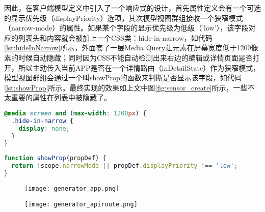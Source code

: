 因此，在客户端模型定义中引入了一个响应式的设计，首先属性定义会有一个可选的显示优先级（displayPriority）选项，其次模型视图群组接收一个狭窄模式（narrow-mode）的属性。如果某个字段的显示优先级为低级（'low'），该字段对应的列表头和内容就会被加上一个CSS类：hide-in-narrow，如代码\ref{lst:hideInNarrow}所示，外面套了一层Media Query让元素在屏幕宽度低于1200像素的时候自动隐藏；同时因为CSS不能自动检测出来右边的编辑或详情页面是否打开，所以主动传入当前APP是否在一个详情路由（inDetailState）作为狭窄模式，模型视图群组会通过一个叫showProp的函数来判断是否显示该字段，如代码\ref{lst:showProp}所示。最终实现的效果如上文中图\ref{fig:sensor_create}所示，一些不太重要的属性在列表中被隐藏了。
\begin{lstlisting}[language={CSS}, label={lst:hideInNarrow}, caption={CSS类hide-in-narrow的代码}]
@media screen and (max-width: 1200px) {
  .hide-in-narrow {
    display: none;
  }
}
\end{lstlisting}

\begin{lstlisting}[language={JavaScript}, label={lst:showProp}, caption={传感器列表页面中的模型输入群组代码}]
function showProp(propDef) {
  return !scope.narrowMode || propDef.displayPriority !== 'low';
}
\end{lstlisting}
\begin{figure}[!htp]
 \centering
 \texttt{[image: generator\_app.png]}

 \vspace{0.1cm}

 \texttt{[image: generator\_apiroute.png]}
\end{figure}
